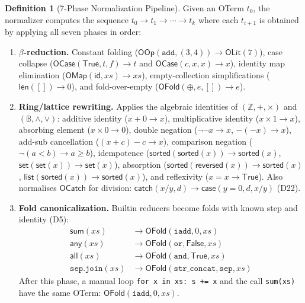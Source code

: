 \documentclass[11pt,a4paper]{report}
\theoremstyle{definition}
\newtheorem{definition}{Definition}[chapter]
\theoremstyle{plain}
\begin{document}
\begin{definition}[7-Phase Normalization Pipeline]
\label{def:7-phase}
Given an OTerm $t_0$, the normalizer computes the sequence
$t_0 \to t_1 \to \cdots \to t_k$ where each $t_{i+1}$ is obtained by
applying all seven phases in order:
\begin{enumerate}[label=\textbf{P\arabic*}:]
  \item \textbf{$\beta$-reduction.}  Constant folding
    ($\mathsf{OOp}(\texttt{add}, (3, 4)) \to \mathsf{OLit}(7)$),
    case collapse ($\mathsf{OCase}(\mathsf{True}, t, f) \to t$ and
    $\mathsf{OCase}(c, x, x) \to x$), identity map elimination
    ($\mathsf{OMap}(\mathsf{id}, xs) \to xs$), empty-collection
    simplifications ($\mathsf{len}([]) \to 0$), and
    fold-over-empty ($\mathsf{OFold}(\oplus, e, []) \to e$).

  \item \textbf{Ring/lattice rewriting.}  Applies the algebraic
    identities of $(\mathbb{Z}, +, \times)$ and $(\mathbb{B},
    \land, \lor)$:
    additive identity ($x + 0 \to x$),
    multiplicative identity ($x \times 1 \to x$),
    absorbing element ($x \times 0 \to 0$),
    double negation ($\lnot\lnot x \to x$, $-(-x) \to x$),
    add-sub cancellation ($(x + c) - c \to x$),
    comparison negation ($\lnot(a < b) \to a \geq b$),
    idempotence ($\mathsf{sorted}(\mathsf{sorted}(x)) \to \mathsf{sorted}(x)$,
    $\mathsf{set}(\mathsf{set}(x)) \to \mathsf{set}(x)$),
    absorption ($\mathsf{sorted}(\mathsf{reversed}(x)) \to \mathsf{sorted}(x)$,
    $\mathsf{list}(\mathsf{sorted}(x)) \to \mathsf{sorted}(x)$),
    and reflexivity ($x = x \to \mathsf{True}$).
    Also normalises $\mathsf{OCatch}$ for division: $\mathsf{catch}(x/y, d)
    \to \mathsf{case}(y{=}0, d, x/y)$ (D22).

  \item \textbf{Fold canonicalization.}  Builtin reducers become folds
    with known step and identity (D5):
    \begin{align*}
      \mathsf{sum}(xs) &\to \mathsf{OFold}(\texttt{iadd}, 0, xs) \\
      \mathsf{any}(xs) &\to \mathsf{OFold}(\texttt{or}, \mathsf{False}, xs) \\
      \mathsf{all}(xs) &\to \mathsf{OFold}(\texttt{and}, \mathsf{True}, xs) \\
      \texttt{sep.join}(xs) &\to \mathsf{OFold}(\texttt{str\_concat}, \texttt{sep}, xs)
    \end{align*}
    After this phase, a manual loop \texttt{for x in xs: s += x} and
    the call \texttt{sum(xs)} have the same OTerm:
    $\mathsf{OFold}(\texttt{iadd}, 0, xs)$.


\end{enumerate}
\end{definition}
\end{document}
